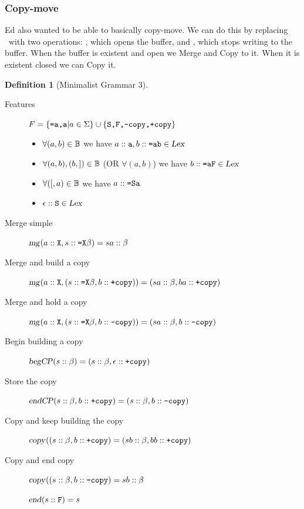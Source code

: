 \documentclass[12pt]{article}
\theoremstyle{definition}
\newtheorem{definition}{Definition}[section]
\begin{document}
\subsubsection{Copy-move}
\label{sec:copy-move}

\newcommand\bcp{\text{\textsl{begCP}}}
\newcommand\ecp{\text{\textsl{endCP}}}


Ed also wanted to be able to basically copy-move. We can do this by replacing \cl~with two operations: \bcp, which opens the buffer, and \ecp, which stops writing to the buffer. When the buffer is existent and open we Merge and Copy to it. When it is existent closed we can Copy it. 

\begin{definition}[Minimalist Grammar 3]\ 


  \begin{description}
  \item[Features] $F=\{\text{\texttt{=a,a}} | a\in \Sigma \}\cup\{\text{\texttt{S,F,-copy,+copy}}\}$

  \item[\Lex]
    \begin{itemize}
    \item $\forall (a,b) \in \mathbb{B}$ we have
      $a::\text{\texttt{a}}, b::\text{\texttt{=ab}} \in \text{\textsl{Lex}}$
    \item $\forall (a,b),(b,{]})\in\mathbb{B}$ (OR $\forall (a,b)$) we have $b::\text{\texttt{=aF}}\in\text{\textsl{Lex}}$
    \item $\forall ({[},a)\in\mathbb{B}$ we have $a::\text{\texttt{=Sa}}$
    \item $\epsilon::\text{\texttt{S}}\in\text{\textsl{Lex}}$
    \end{itemize}

  \item[Merge simple] $\text{\textsl{mg}}( a::\text{\texttt{X}}, s::\text{\texttt{=X}}\beta) = sa::\beta$
  \item[Merge and build a copy] $\text{\textsl{mg}}( a::\text{\texttt{X}}, (s::\text{\texttt{=X}}\beta,b::\text{\texttt{+copy}})) = (sa::\beta,ba::\text{\texttt{+copy}})$
  \item[Merge and hold a copy] $\text{\textsl{mg}}( a::\text{\texttt{X}}, (s::\text{\texttt{=X}}\beta,b::\text{\texttt{-copy}})) = (sa::\beta,b::\text{\texttt{-copy}})$
  \item[Begin building a copy] $\bcp(s::\beta) = (s::\beta,\emp::\fea{+copy})$
  \item[Store the copy] $\ecp(s::\beta,b::\fea{+copy}) = (s::\beta,b::\fea{-copy})$


  \item[Copy and keep building the copy] $\text{\textsl{copy}}((s::\beta,b::\text{\texttt{+copy}}) = (sb::\beta, bb::\text{\texttt{+copy}})$
  \item[Copy and end copy] $\text{\textsl{copy}}((s::\beta,b::\text{\texttt{-copy}}) = sb::\beta$

  \item[\ed] $\text{\textsl{end}}(s::\text{\texttt{F}}) = s$


  \end{description}


\end{definition}
\end{document}

